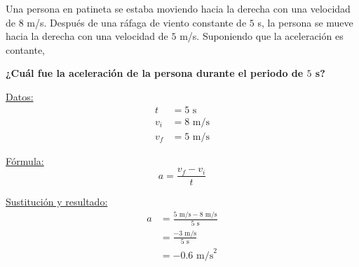 \question[10] Una persona en patineta se estaba moviendo hacia la derecha con una velocidad de $8$ m/s.
Después de una ráfaga de viento constante de $5$ s, la persona se mueve hacia la derecha con una velocidad de $5$ m/s.
Suponiendo que la aceleración es contante,

\textbf{¿Cuál fue la aceleración de la persona durante el periodo de $5$ s?}

\begin{minipage}[c]{\linewidth}
    \begin{solutionbox}{5cm}
        \begin{minipage}[t]{0.3\textwidth}
            \centering
            \underline{Datos:}
            \begin{align*}
                t   & =  5 \text{ s}  \\
                v_i & = 8  \text{ m/s} \\
                v_f & = 5  \text{ m/s}
            \end{align*}
        \end{minipage}%
        \begin{minipage}[t]{0.3\textwidth}
            \centering
            \underline{F\'ormula:}
            \begin{equation*}
                a=\frac{v_f-v_i}{t}
            \end{equation*}
        \end{minipage}
        \begin{minipage}[t]{0.3\textwidth}
            \centering
            \underline{Sustituci\'on y resultado:}
            \begin{align*}
                a & =\frac{5 \text{ m/s}-8 \text{ m/s}}{5 \text{ s}} \\
                  & = \frac{-3 \text{ m/s}}{5 \text{ s}}             \\
                  & =-0.6 \text{ m/s}^2
            \end{align*}
        \end{minipage}
    \end{solutionbox}
\end{minipage}